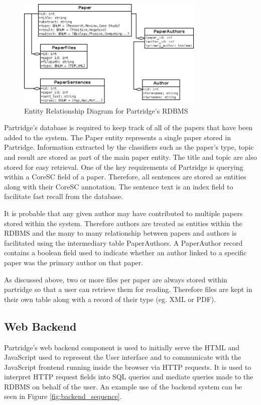 \begin{figure}[th]
\vspace{5mm}
\centering
\includegraphics[width=0.8\textwidth]{images/design/e-r-diagram.png}
\caption{Entity Relationship Diagram for Partridge's RDBMS}
\label{fig:e-r-diagram}
\end{figure}

Partridge's database is required to keep track of all of the papers that have
been added to the system. The Paper entity represents a single paper stored in
Partridge. Information extracted by the classifiers such as the paper's type,
topic and result are stored as part of the main paper entity. The title and
topic are also stored for easy retrieval. One of the key requirements of
Partridge is querying within a CoreSC field of a paper. Therefore, all
sentences are stored as entities along with their CoreSC annotation. The sentence
text is an index field to facilitate fast recall from the database.

It is probable that any given author may have contributed to multiple papers
stored within the system.  Therefore authors are treated as entities within the
RDBMS and the many to many relationship between papers and authors is
facilitated using the intermediary table PaperAuthors. A PaperAuthor record
contains a boolean field used to indicate whether an author linked to a
specific paper was the primary author on that paper.

As discussed above, two or more files per paper are always stored within
partridge so that a user can retrieve them for reading. Therefore files are
kept in their own table along with a record of their type (eg. XML or PDF). 

\subsection{ Web Backend }

Partridge's web backend component is used to initially serve the HTML and
JavaScript used to represent the User interface and to communicate with the
JavaScript frontend running inside the browser via HTTP requests. It is used to
interpret HTTP request fields into SQL queries and mediate queries made to the
RDBMS on behalf of the user. An example use of the backend system can be seen
in Figure \ref{fig:backend_sequence}.

